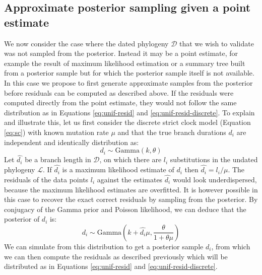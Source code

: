 \documentclass{article}
\begin{document}
\subsection*{Approximate posterior sampling given a point estimate}

We now consider the case where the dated phylogeny $\mathcal{D}$ that we wish
to validate was not sampled from the posterior. Instead it may be a point estimate, 
for example the result of maximum likelihood estimation
or a summary tree built from a posterior sample \citep{heledLookingTreesForest2013}
but for which the posterior sample itself is not available.
In this case we propose to first generate approximate 
samples from the posterior before residuals can be computed as described above.
If the residuals were computed directly from the point estimate, they would not follow the same distribution as in Equations
\ref{eq:unif-resid} and \ref{eq:unif-resid-discrete}.
To explain and illustrate this, let us first consider the discrete strict clock model (Equation \ref{eq:sc})
with known mutation rate $\mu$
and that the true branch durations $d_i$ are independent and identically
distribution as:
\begin{equation}
d_i \sim \mathrm{Gamma}(k,\theta)
\end{equation}
Let $\hat{d_i}$ be a branch length in $\mathcal{D}$, on which there are $l_i$ substitutions in the undated phylogeny $\mathcal{L}$. If $\hat{d_i}$ is a maximum likelihood estimate of $d_i$ then
$\hat{d_i}=l_i/\mu$.
The residuals of the data points $l_i$ against the estimates $\hat{d_i}$ would look
underdispersed, because the maximum likelihood estimates are overfitted.
It is however possible in this case to recover the exact correct residuals by sampling from
the posterior. 
By conjugacy of the Gamma prior and Poisson likelihood, we can deduce that the posterior of $d_i$ is:
\begin{equation}
d_i \sim \mathrm{Gamma}\left(k+\hat{d_i} \mu,\frac{\theta}{1+\theta \mu}\right)
\end{equation}
We can simulate from this distribution to get a posterior sample $d_i$, from which we can then compute the residuals as 
described previously which will be distributed as in 
Equations \ref{eq:unif-resid} and \ref{eq:unif-resid-discrete}.
\end{document}
